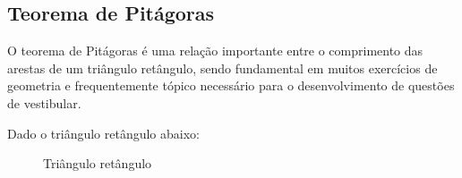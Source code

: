 \begin{multicols*}{2}
    \begin{table}[H]
        \renewcommand\arraystretch{2.5}
        \centering
        \caption{Tabela seno, cosseno e tangente}
        \label{tab:trig_val}
    \end{table}
 
    \subsection{Teorema de Pitágoras}
    
    O teorema de Pitágoras é uma relação importante entre o comprimento das arestas 
    de um triângulo retângulo, sendo fundamental em muitos exercícios de geometria
    e frequentemente tópico necessário para o desenvolvimento de questões de 
    vestibular.

    \noindent
    Dado o triângulo retângulo abaixo:
    \begin{figure}[H]
        \centering
        \caption{Triângulo retângulo}
        \label{fig:tri_abc}
    \end{figure}


\end{multicols*}
